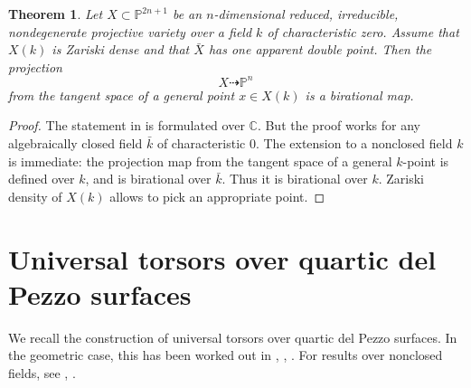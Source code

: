 \documentclass[12pt, reqno]{amsart}
\theoremstyle{plain}
\newtheorem{theo}[prop]{Theorem}
\theoremstyle{remark}
\theoremstyle{definition}
\numberwithin{equation}{section}
\def\bP{{\mathbb P}}
\def\bC{{\mathbb C}}
\begin{document}
\begin{theo}
\label{thm:projection}
Let $X\subset \bP^{2n+1}$ be an $n$-dimensional reduced, irreducible, nondegenerate projective variety over a field $k$ of characteristic zero. Assume that
$X(k)$ is Zariski dense and that $\bar{X}$ has one apparent double point. Then the projection 
$$
X\dashrightarrow \bP^n
$$
from the tangent space  
    of a general point $x\in X(k)$ is a birational map.
\end{theo}

\begin{proof}
The statement in \cite[Theorem 2.7]{projection} is formulated over $\bC$. But the proof works for any algebraically closed field $\bar k$ of characteristic 0. 
The extension to a nonclosed field $k$ is immediate: the projection map from the tangent space of a general $k$-point is defined over $k$, and is birational over $\bar{k}$. Thus it is birational over $k$. Zariski density of $X(k)$ allows to pick an appropriate point. 
\end{proof}



\section{Universal torsors over quartic del Pezzo surfaces}
\label{sect:rat}

We recall the construction of universal torsors over quartic del Pezzo surfaces. In the geometric case, this has been worked out in \cite{Coxderenthalhomogeneous}, \cite{batycox}, \cite{SS}. 
For results over nonclosed fields, see \cite{CTSansucDuke}, \cite{derenthal-non}.
\end{document}
